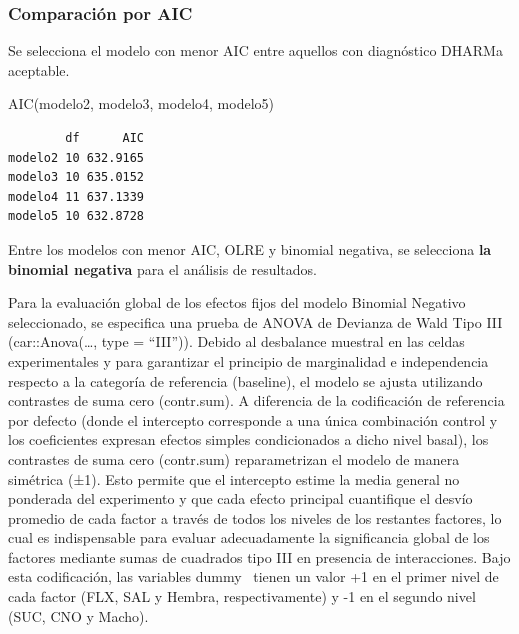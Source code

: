 \documentclass[
  letterpaper,
  DIV=11,
  numbers=noendperiod]{scrartcl}
\newenvironment{Shaded}{\begin{snugshade}}{\end{snugshade}}
\newcommand{\FunctionTok}[1]{\textcolor[rgb]{0.28,0.35,0.67}{#1}}
\newcommand{\NormalTok}[1]{\textcolor[rgb]{0.00,0.23,0.31}{#1}}
\begin{document}
\subsubsection{\texorpdfstring{\textbf{Comparación por
AIC}}{Comparación por AIC}}\label{comparaciuxf3n-por-aic}

Se selecciona el modelo con menor AIC entre aquellos con diagnóstico
DHARMa aceptable.

\begin{Shaded}
\begin{Highlighting}[]
\FunctionTok{AIC}\NormalTok{(modelo2, modelo3, modelo4, modelo5)}
\end{Highlighting}
\end{Shaded}

\begin{verbatim}
        df      AIC
modelo2 10 632.9165
modelo3 10 635.0152
modelo4 11 637.1339
modelo5 10 632.8728
\end{verbatim}

\begin{tcolorbox}[enhanced jigsaw, arc=.35mm, bottomrule=.15mm, bottomtitle=1mm, breakable, colback=white, colbacktitle=quarto-callout-tip-color!10!white, colframe=quarto-callout-tip-color-frame, coltitle=black, left=2mm, leftrule=.75mm, opacityback=0, opacitybacktitle=0.6, rightrule=.15mm, title=\textcolor{quarto-callout-tip-color}{\faLightbulb}\hspace{0.5em}{Selección del modelo}, titlerule=0mm, toprule=.15mm, toptitle=1mm]

Entre los modelos con menor AIC, OLRE y binomial negativa, se selecciona
\textbf{la binomial negativa} para el análisis de resultados.

\end{tcolorbox}

Para la evaluación global de los efectos fijos del modelo Binomial
Negativo seleccionado, se especifica una prueba de ANOVA de Devianza de
Wald Tipo III (car::Anova(\ldots, type = ``III'')). Debido al desbalance
muestral en las celdas experimentales y para garantizar el principio de
marginalidad e independencia respecto a la categoría de referencia
(baseline), el modelo se ajusta utilizando contrastes de suma cero
(contr.sum). A diferencia de la codificación de referencia por defecto
(donde el intercepto corresponde a una única combinación control y los
coeficientes expresan efectos simples condicionados a dicho nivel
basal), los contrastes de suma cero (contr.sum) reparametrizan el modelo
de manera simétrica (±1). Esto permite que el intercepto estime la media
general no ponderada del experimento y que cada efecto principal
cuantifique el desvío promedio de cada factor a través de todos los
niveles de los restantes factores, lo cual es indispensable para evaluar
adecuadamente la significancia global de los factores mediante sumas de
cuadrados tipo III en presencia de interacciones. Bajo esta
codificación, las variables dummy~ tienen un valor +1 en el primer nivel
de cada factor (FLX, SAL y Hembra, respectivamente) y -1 en el segundo
nivel (SUC, CNO y Macho).~
\end{document}
